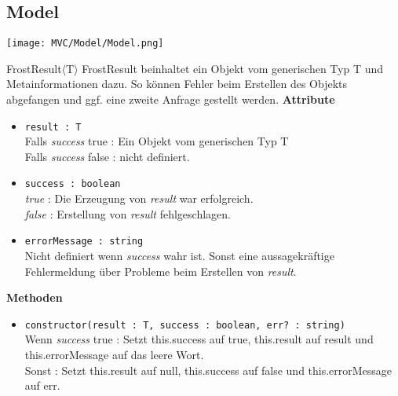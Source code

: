 \subsection{Model}

\texttt{[image: MVC/Model/Model.png]}
\newpage

    \begin{Class}{FrostResult$\langle$T$\rangle$}
        FrostResult beinhaltet ein Objekt vom generischen Typ T und Metainformationen dazu.
        So können Fehler beim Erstellen des Objekts abgefangen und ggf. eine zweite Anfrage gestellt werden.
        \textbf{Attribute}
        \begin{itemize}
            \item \texttt{result : T}
            \\ Falls \emph{success} true : Ein Objekt vom generischen Typ T
            \\ Falls \emph{success} false : nicht definiert.
            \item \texttt{success : boolean}
            \\ \emph{true} : Die Erzeugung von \emph{result} war erfolgreich.
            \\ \emph{false} : Erstellung von \emph{result} fehlgeschlagen.
            \item \texttt{errorMessage : string}
            \\ Nicht definiert wenn \emph{success} wahr ist.
            Sonst eine aussagekräftige Fehlermeldung über Probleme beim Erstellen von \emph{result}.
        \end{itemize}

        \textbf{Methoden}
        \begin{itemize}
            \item \texttt{constructor(result : T, success : boolean, err? : string)}
            \\ Wenn \emph{success} true : Setzt this.success auf true,  this.result auf result und this.errorMessage auf das leere Wort.
            \\ Sonst : Setzt this.result auf null, this.success auf false und this.errorMessage auf err.
        \end{itemize}
    \end{Class}

